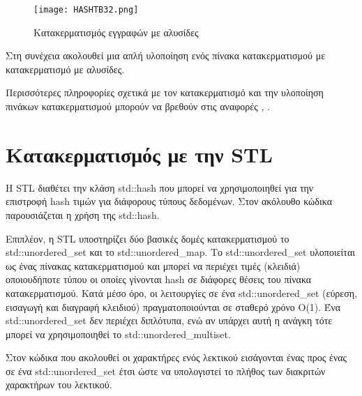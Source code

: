 \begin{figure}[ht]
\centering
\texttt{[image: HASHTB32.png]}
\caption{Κατακερματισμός εγγραφών με αλυσίδες \cite{wiki_hashtables}}
\label{fig:hashtable3}
\end{figure}

Στη συνέχεια ακολουθεί μια απλή υλοποίηση ενός πίνακα κατακερματισμού με κατακερματισμό με αλυσίδες. 





Περισσότερες πληροφορίες σχετικά με τον κατακερματισμό και την υλοποίηση πινάκων κατακερματισμού μπορούν να βρεθούν στις αναφορές \cite{pumpkin_hashtables}, \cite{hackerearth_hashtables}.

\section{Κατακερματισμός με την STL}
Η STL διαθέτει την κλάση std::hash που μπορεί να χρησιμοποιηθεί για την επιστροφή hash τιμών για διάφορους τύπους δεδομένων. Στον ακόλουθο κώδικα παρουσιάζεται η χρήση της 
std::hash.




 

Επιπλέον, η STL υποστηρίζει δύο βασικές δομές κατακερματισμού το std::unordered\_set και το std::unordered\_map. Το std::unordered\_set υλοποιείται ως ένας πίνακας κατακερματισμού και μπορεί να περιέχει τιμές (κλειδιά) οποιουδήποτε τύπου οι οποίες γίνονται hash σε διάφορες θέσεις του πίνακα κατακερματισμού. Κατά μέσο όρο, οι λειτουργίες σε ένα std::unordered\_set (εύρεση, εισαγωγή και διαγραφή κλειδιού) πραγματοποιούνται σε σταθερό χρόνο O(1). Ένα std::unordered\_set δεν περιέχει διπλότυπα, ενώ αν υπάρχει αυτή η ανάγκη τότε μπορεί να χρησιμοποιηθεί το std::unordered\_multiset. 

Στον κώδικα που ακολουθεί οι χαρακτήρες ενός λεκτικού εισάγονται ένας προς ένας σε ένα std::unordered\_set έτσι ώστε να υπολογιστεί το πλήθος των διακριτών χαρακτήρων του λεκτικού.





